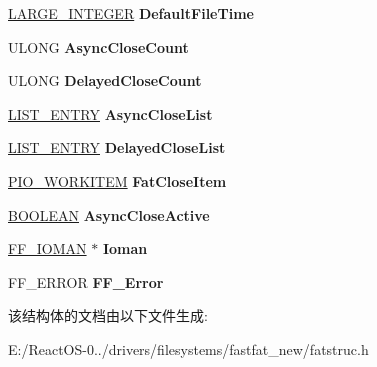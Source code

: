 \begin{DoxyCompactItemize}
\hyperlink{union___l_a_r_g_e___i_n_t_e_g_e_r}{L\+A\+R\+G\+E\+\_\+\+I\+N\+T\+E\+G\+ER} {\bfseries Default\+File\+Time}
\item 
\mbox{\label{struct___f_a_t___g_l_o_b_a_l___d_a_t_a_a4a334b9d5e0fe78b7bc7fb60463367d2}} 
U\+L\+O\+NG {\bfseries Async\+Close\+Count}
\item 
\mbox{\label{struct___f_a_t___g_l_o_b_a_l___d_a_t_a_a14f28bbcbe8805bc9e75f12b47e2a16b}} 
U\+L\+O\+NG {\bfseries Delayed\+Close\+Count}
\item 
\mbox{\label{struct___f_a_t___g_l_o_b_a_l___d_a_t_a_a94c3327de14ef1fe305550322f33a129}} 
\hyperlink{struct___l_i_s_t___e_n_t_r_y}{L\+I\+S\+T\+\_\+\+E\+N\+T\+RY} {\bfseries Async\+Close\+List}
\item 
\mbox{\label{struct___f_a_t___g_l_o_b_a_l___d_a_t_a_a05339b89afc4914e69dd1132dcb6c09b}} 
\hyperlink{struct___l_i_s_t___e_n_t_r_y}{L\+I\+S\+T\+\_\+\+E\+N\+T\+RY} {\bfseries Delayed\+Close\+List}
\item 
\mbox{\label{struct___f_a_t___g_l_o_b_a_l___d_a_t_a_a3d5a225242161d454bd80c6a07e310f4}} 
\hyperlink{struct___i_o___w_o_r_k_i_t_e_m}{P\+I\+O\+\_\+\+W\+O\+R\+K\+I\+T\+EM} {\bfseries Fat\+Close\+Item}
\item 
\mbox{\label{struct___f_a_t___g_l_o_b_a_l___d_a_t_a_afc2bedff7996439c4b314c7bff9d50f7}} 
\hyperlink{_processor_bind_8h_a112e3146cb38b6ee95e64d85842e380a}{B\+O\+O\+L\+E\+AN} {\bfseries Async\+Close\+Active}
\item 
\mbox{\label{struct___f_a_t___g_l_o_b_a_l___d_a_t_a_a5421dd040b3f73e9db336a6aecd05ffc}} 
\hyperlink{struct_f_f___i_o_m_a_n}{F\+F\+\_\+\+I\+O\+M\+AN} $\ast$ {\bfseries Ioman}
\item 
\mbox{\label{struct___f_a_t___g_l_o_b_a_l___d_a_t_a_a6f4485f2328263e1f0820af96ec6f5c4}} 
F\+F\+\_\+\+E\+R\+R\+OR {\bfseries F\+F\+\_\+\+Error}
\end{DoxyCompactItemize}


该结构体的文档由以下文件生成\+:\begin{DoxyCompactItemize}
\item 
E\+:/\+React\+O\+S-\/0../drivers/filesystems/fastfat\+\_\+new/fatstruc.\+h\end{DoxyCompactItemize}
